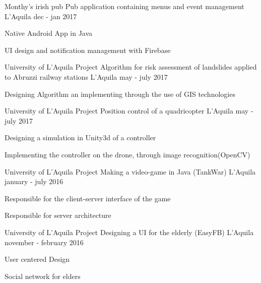 \begin{cventries}
\cventry
{Monthy's irish pub}%
{Pub application containing menus and event management} %
{L'Aquila} %
{dec - jan 2017} %
{ %
	\begin{cvitems}
		\item {Native Android App in Java}
		\item {UI design and notification management with Firebase}
	\end{cvitems}
}

\cventry
{University of L'Aquila Project}%
{Algorithm for risk assessment of landslides applied to Abruzzi railway stations} %
{L'Aquila} %
{may - july 2017} %
{ %
	\begin{cvitems}
		\item {Designing Algorithm an implementing through the use of GIS technologies}
	\end{cvitems}
}

\cventry
{University of L'Aquila Project}%
{Position control of a quadricopter} %
{L'Aquila} %
{may - july 2017} %
{ %
	\begin{cvitems}
		\item {Designing a simulation in Unity3d of a controller}
		\item {Implementing the controller on the drone, through image recognition(OpenCV)}
	\end{cvitems}
}

\cventry
{University of L'Aquila Project} %
{Making a video-game in Java (TankWar)} %
{L'Aquila} %
{january - july 2016} %
{ %
	\begin{cvitems}
		\item {Responsible for the client-server interface of the game}
		\item {Responsible for server architecture}
	\end{cvitems}
}

\cventry
{University of L'Aquila Project} %
{Designing a UI for the elderly (EasyFB)} %
{L'Aquila} %
{november - february 2016} %
{ %
	\begin{cvitems}
		\item {User centered Design}
		\item {Social network for elders}
	\end{cvitems}
}


\end{cventries}
